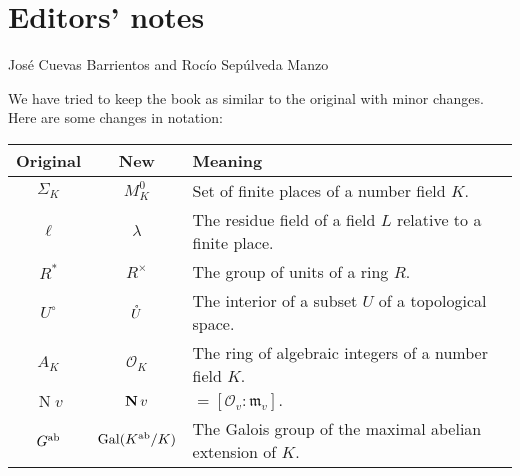 \chapter*{Editors' notes}

\begin{center}
José Cuevas Barrientos and Rocío Sepúlveda Manzo
\end{center}

We have tried to keep the book as similar to the original with minor changes.
Here are some changes in notation:
\begin{longtable}{|c|c|p{9cm}|}
	\hline
	\textbf{Original} & \textbf{New} & \textbf{Meaning} \\
	\hline
	\endhead

	\hline
	\endfoot

	$\Sigma_K$ & $M_K^0$ & Set of finite places of a number field $K$. \\
	$\ell$ & $\lambda$ & The residue field of a field $L$ relative to a finite place. \\
	$R^*$ & $R^\times$ & The group of units of a ring $R$. \\
	$U^\circ$ & $\mathring{U}$ & The interior of a subset $U$ of a topological space. \\
	$A_K$ & $\mathcal{O}_K$ & The ring of algebraic integers of a number field $K$. \\
	$\operatorname{N} v$ & $\operatorname{\mathbf{N}} v$ & ${} = [\mathcal{O}_v : \mathfrak{m}_v].$ \\
	$G^{\mathrm{ab}}$ & $\operatorname{Gal}(K^{\mathrm{ab}}/K)$ & The Galois group of the maximal abelian extension of $K$. \\
\end{longtable}


